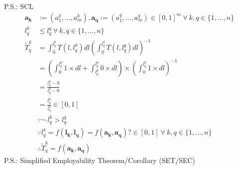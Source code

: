 \documentclass[hidelinks, nonatbib]{elsarticle}
\begin{document}
    P.S.: SCL
    \begin{align}
        \boldsymbol{a_k}
        &:= (a_{1}^{k}, \dots, a_{m}^{k})
        ,
        \boldsymbol{a_q}
        := (a_{1}^{q}, \dots, a_{m}^{q})
        \in [0,1]^{m}
        \
        \forall
        \
        k,q \in \{1, \dots, n\}
        \\
        l_{q}^{k}
        &\leq 
        l_{q}^{q}
        \
        \forall
        \
        k,q \in \{1, \dots, n\}
        \\
        \tilde{T}_{q}^{k}
        &= 
        \int_{0}^{l_{q}^{q}}{
            T(l,l_{q}^{k})
            dl
        }
        \left(
            \int_{0}^{l_{q}^{q}}{
                T(l,l_{q}^{q})
                dl
            }
        \right) ^ {-1}
        \\
        &= 
        \left(
            \int_{0}^{l_{q}^{k}}{
                1
                \times
                dl
            }
            +
            \int_{l_{q}^{k}}^{l_{q}^{q}}{
                0
                \times
                dl
            }
        \right)
        \times
        \left(
            \int_{0}^{l_{q}^{q}}{
                1
                \times
                dl
            }
        \right) ^ {-1}
        \\
        &= 
        \frac{l_{q}^{k} - 0}{l_{q}^{q} - 0}
        \\
        &= 
        \frac{l_{q}^{k}}{l_{q}^{q}}
        \in [0,1]
        \\
        &\because
        \neg
        \
        l_{q}^{k}
        >
        l_{q}^{q}
        \\
        &\because
        l_{q}^{k} = 
        f(
            \boldsymbol{l_k},
            \boldsymbol{l_q}
        ) 
        =
        f(
            \boldsymbol{a_k},
            \boldsymbol{a_q}
        )?
        \in [0,1]
        \
        \forall
        \
        k,q \in \{1, \dots, n\}
        \\
        &\therefore
        \tilde{T}_{q}^{k}
        =
        f(
            \boldsymbol{a_k},
            \boldsymbol{a_q}
        )
    \end{align}
    P.S.: Simplified Employability Theorem/Corollary (SET/SEC)
\end{document}
